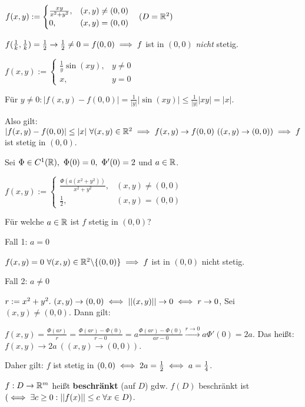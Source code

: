 \documentclass[a4paper,twoside,DIV15,BCOR12mm]{scrbook}
\begin{document}
\begin{beispiele}
\item $f(x,y) := \begin{cases}
\frac{xy}{x^2+y^2}, & (x,y) \ne (0,0)\\
0,                  & (x,y) = (0,0)
\end{cases}\quad(D = \mathbb{R}^2)$

$f(\frac{1}{k},\frac{1}{k}) = \frac{1}{2} \to \frac{1}{2} \ne 0 = f(0,0) \implies f$ ist in $(0,0)$ \emph{nicht} stetig.

\item $f(x,y) := \begin{cases}
\frac{1}{y} \sin(xy), & y \ne 0\\
x,                    & y = 0
\end{cases}$

Für $y \ne 0: |f(x,y) - f(0,0)| = \frac{1}{|y|}|\sin(xy)| \le \frac{1}{|y|}|xy| = |x|.$

Also gilt: $|f(x,y) - f(0,0)| \le |x|\ \forall (x,y) \in \MdR^2 \folgt f(x,y) \to f(0,0)\ ((x,y) \to (0,0)) \folgt f$ ist stetig in $(0,0)$.

\item Sei $\Phi \in C^1(\MdR),\ \Phi(0) = 0,\ \Phi'(0) = 2$ und $a \in \mathbb{R}$.

$f(x,y) := \begin{cases}
\frac{\Phi(a(x^2+y^2))}{x^2+y^2}, & (x,y) \ne (0,0)\\
\frac{1}{2},                      & (x,y) = (0,0)
\end{cases}$

Für welche $a \in \mathbb{R}$ ist $f$ stetig in $(0,0)$?

Fall 1: $a = 0$

$f(x,y) = 0\ \forall(x,y) \in \mathbb{R}^2\backslash\{(0,0)\} \implies f$ ist in $(0,0)$ nicht stetig.

Fall 2: $a \ne 0$

$r := x^2 + y^2.\ (x,y) \to (0,0) \iff ||(x,y)|| \to 0 \iff r \to 0$, Sei $(x,y) \ne (0,0)$. Dann gilt:

$f(x,y) = \frac{\Phi(ar)}{r} = \frac{\Phi(ar) - \Phi(0)}{r - 0} = a \frac{\Phi(ar) - \Phi(0)}{ar - 0} \overset{r \to 0}{\to} a \Phi'(0) = 2a$. Das heißt: $f(x,y) \to 2a\ ((x,y)\to(0,0))$.

Daher gilt: $f$ ist stetig in $(0,0) \iff 2a = \frac{1}{2} \iff a = \frac{1}{4}$.
\end{beispiele}

\begin{definition*}
$f:D \to \mathbb{R}^m$ heißt \textbf{beschränkt} (auf $D$) gdw. $f(D)$ beschränkt ist $(\iff \exists c \ge 0: ||f(x)|| \le c\ \forall x \in D)$.
\end{definition*}
\end{document}

